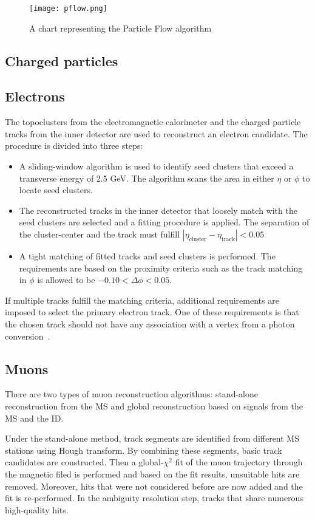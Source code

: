\begin{figure}[htbp]
    \centering
    \texttt{[image: pflow.png]}
    \caption[Particle flow overview]{A chart representing the Particle Flow algorithm~\cite{PERF-2015-09}}%
    \label{fig:pflow}
\end{figure}

\subsection{Charged particles}
\subsection*{Electrons}
The topoclusters from the electromagnetic calorimeter and the charged particle tracks from the inner
detector are used to reconstruct an electron candidate. The procedure is divided into three steps:
\begin{itemize}
    \item A sliding-window algorithm is used to identify seed clusters that exceed a transverse
    energy of 2.5 GeV. The algorithm scans the area in either $\eta$ or $\phi$ to locate seed clusters. 
    \item The reconstructed tracks in the inner detector that loosely match with the seed clusters
    are selected and a fitting procedure is applied. The separation of the cluster-center and the 
    track must fulfill $|\eta_{\text{cluster}} - \eta_{\text{track}}|<0.05$
    \item A tight matching of fitted tracks and seed clusters is performed. The requirements are based
    on the proximity criteria such as the track matching in $\phi$ is allowed to be $-0.10< \Delta\phi <0.05$.
\end{itemize}

If multiple tracks fulfill the matching criteria, additional requirements are imposed to select the 
primary electron track. One of these requirements is that the chosen track should not have any association with 
a vertex from a photon conversion~\cite{PERF-2017-01}. 

\subsection*{Muons}
There are two types of muon reconstruction algorithms: stand-alone reconstruction from the MS and global
reconstruction based on signals from the MS and the ID. 

Under the stand-alone method, track segments are identified from different MS stations using Hough transform.
By combining these segments, basic track candidates are constructed. Then a global-$\chi^2$ fit of the 
muon trajectory through the magnetic filed is performed and based on the fit results, unsuitable hits are
removed. Moreover, hits that were not considered before are now added and the fit is re-performed. 
In the ambiguity resolution step, tracks that share numerous high-quality hits. 


